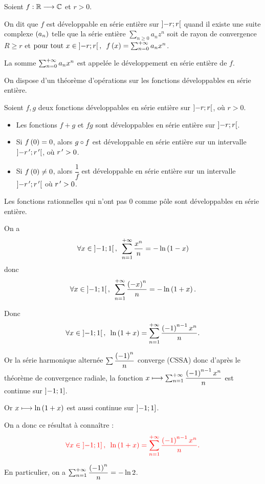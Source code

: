 \begin{defi}
Soient \(f:\mathbb{R}\longrightarrow\mathbb{C}\) et \(r>0\).

On dit que \(f\) est développable en série entière sur \(\left]-r;r\right[\) quand il existe une suite complexe \(\left(a_n\right)\) telle que la série entière \(\sum_{n\geq0}a_nz^n\) soit de rayon de convergence \(R\geq r\) et \(\quantifs{\tpt x\in\intervee{-r}{r}}f\paren{x}=\sum_{n=0}^{\pinf}a_nx^n\).

La somme \(\sum_{n=0}^{+\infty}a_nx^n\) est appelée le développement en série entière de \(f\).
\end{defi}

On dispose d'un théorème d'opérations sur les fonctions développables en série entière.

\begin{theo}
Soient \(f,g\) deux fonctions développables en série entière sur \(\left]-r;r\right[\), où \(r>0\).

\begin{itemize}
    \item Les fonctions \(f+g\) et \(fg\) sont développables en série entière sur \(\left]-r;r\right[\). \\
    \item Si \(f\left(0\right)=0\), alors \(g\circ f\) est développable en série entière sur un intervalle \(\left]-r^{\,\prime};r^{\,\prime}\right[\), où \(r^{\,\prime}>0\). \\
    \item Si \(f\left(0\right)\not=0\), alors \(\dfrac{1}{f}\) est développable en série entière sur un intervalle \(\left]-r^{\,\prime};r^{\,\prime}\right[\) où \(r^{\,\prime}>0\).
\end{itemize}
\end{theo}

\begin{ex}
Les fonctions rationnelles qui n'ont pas \(0\) comme pôle sont développables en série entière.
\end{ex}

\begin{corr}
On a \[\quantifs{\forall x\in\intervee{-1}{1}}\sum_{n=1}^{\pinf}\dfrac{x^n}{n}=-\ln\paren{1-x}\] donc \[\quantifs{\forall x\in\intervee{-1}{1}}\sum_{n=1}^{\pinf}\dfrac{\paren{-x}^n}{n}=-\ln\paren{1+x}.\]

Donc \[\quantifs{\forall x\in\intervee{-1}{1}}\ln\paren{1+x}=\sum_{n=1}^{\pinf}\dfrac{\paren{-1}^{n-1}x^n}{n}.\]

Or la série harmonique alternée \(\sum\dfrac{\left(-1\right)^n}{n}\) converge (CSSA) donc d'après le théorème de convergence radiale, la fonction \(x\longmapsto\sum_{n=1}^{+\infty}\dfrac{\left(-1\right)^{n-1}x^n}{n}\) est continue sur \(\left]-1;1\right]\).

Or \(x\longmapsto\ln\left(1+x\right)\) est aussi continue sur \(\left]-1;1\right]\).

On a donc ce résultat à connaître : \[\color{red}\quantifs{\forall x\in\intervei{-1}{1}}\ln\paren{1+x}=\sum_{n=1}^{\pinf}\dfrac{\paren{-1}^{n-1}x^n}{n}.\color{black}\]

En particulier, on a \(\sum_{n=1}^{+\infty}\dfrac{\left(-1\right)^n}{n}=-\ln2\).
\end{corr}

